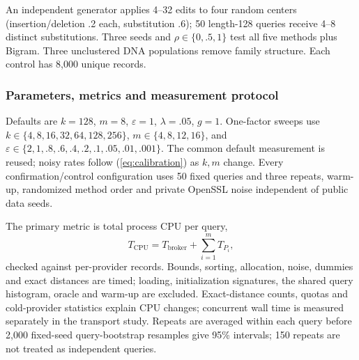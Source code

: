 An independent generator applies 4--32 edits to four random centers (insertion/deletion .2 each, substitution .6); 50 length-128 queries receive 4--8 distinct substitutions. Three seeds and $\rho\in\{0,.5,1\}$ test all five methods plus Bigram. Three unclustered DNA populations remove family structure. Each control has 8,000 unique records.



\subsubsection{Parameters, metrics and measurement protocol}
Defaults are $k=128$, $m=8$, $\varepsilon=1$, $\lambda=.05$, $g=1$. One-factor sweeps use $k\in\{4,8,16,32,64,128,256\}$, $m\in\{4,8,12,16\}$, and $\varepsilon\in\{2,1,.8,.6,.4,.2,.1,.05,.01,.001\}$. The common default measurement is reused; noisy rates follow (\ref{eq:calibration}) as $k,m$ change. Every confirmation/control configuration uses 50 fixed queries and three repeats, warm-up, randomized method order and private OpenSSL noise independent of public data seeds.

The primary metric is total process CPU per query,
\begin{equation}
 T_{\mathrm{CPU}}=T_{\mathrm{broker}}+\sum_{i=1}^{m}T_{P_i},
\end{equation}
checked against per-provider records. Bounds, sorting, allocation, noise, dummies and exact distances are timed; loading, initialization signatures, the shared query histogram, oracle and warm-up are excluded. Exact-distance counts, quotas and cold-provider statistics explain CPU changes; concurrent wall time is measured separately in the transport study. Repeats are averaged within each query before 2,000 fixed-seed query-bootstrap resamples give 95\% intervals; 150 repeats are not treated as independent queries.
